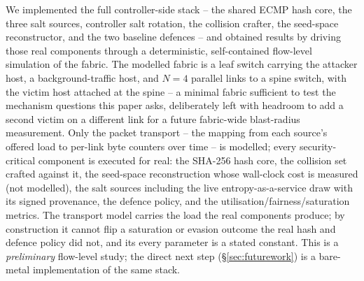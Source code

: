 \documentclass[conference]{IEEEtran}
\begin{document}
We implemented the full controller-side stack -- the shared ECMP hash core, the three salt sources, controller
salt rotation, the collision crafter, the seed-space reconstructor, and the two baseline defences -- and obtained
results by driving those real components through a deterministic, self-contained flow-level simulation of the
fabric. The modelled fabric is a leaf switch carrying the attacker host, a background-traffic host, and $N{=}4$
parallel links to a spine switch, with the victim host attached at the spine -- a minimal fabric sufficient to
test the mechanism questions this paper asks, deliberately left with headroom to add a second victim on a
different link for a future fabric-wide blast-radius measurement. Only the packet transport -- the mapping from
each source's offered load to per-link byte counters over time -- is modelled; every security-critical component
is executed for real: the SHA-256 hash core, the collision set crafted against it, the seed-space reconstruction
whose wall-clock cost is measured (not modelled), the salt sources including the live entropy-as-a-service draw
with its signed provenance, the defence policy, and the utilisation/fairness/saturation metrics. The transport
model carries the load the real components produce; by construction it cannot flip a saturation or evasion
outcome the real hash and defence policy did not, and its every parameter is a stated constant. This is a
\emph{preliminary} flow-level study; the direct next step (\S\ref{sec:futurework}) is a bare-metal
implementation of the same stack.
\end{document}
